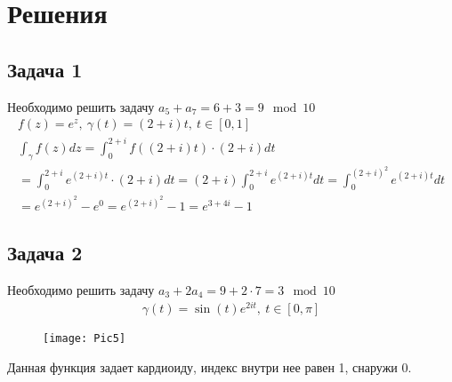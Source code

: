
\newpage
\section*{Решения}
\subsection*{Задача 1}
	Необходимо решить задачу $a_5 + a_7 = 6 + 3 = 9 \mod 10$
	\begin{gather*}
		f(z) = e^z,\ \gamma(t) = (2 + i)t,\ t \in [0,1]\\
		\int_{\gamma}f(z)dz 
		= \int_{0}^{2+i} f((2+i)t) \cdot (2+i) dt\\
		= \int_{0}^{2+i} e^{(2+i)t} \cdot (2+i) dt
		= (2+i) \int_{0}^{2+i} e^{(2+i)t}dt
		= \int_{0}^{(2+i)^2} e^{(2+i)t}dt\\
		= e^{(2+i)^2} - e^0
		= e^{(2+i)^2} - 1
		= e^{3 + 4i} - 1
	\end{gather*}
\vskip 0.4in

\subsection*{Задача 2}
	Необходимо решить задачу $a_3 + 2a_4 = 9 + 2 \cdot 7 = 3 \mod 10$
	\begin{gather*}
		\gamma(t) = \sin(t)e^{2it},\ t \in [0, \pi]
	\end{gather*}
	\begin{figure}[h]
		\texttt{[image: Pic5]}
	\end{figure}
	Данная функция задает кардиоиду, индекс внутри нее равен 1, снаружи 0.
\vskip 0.4in

